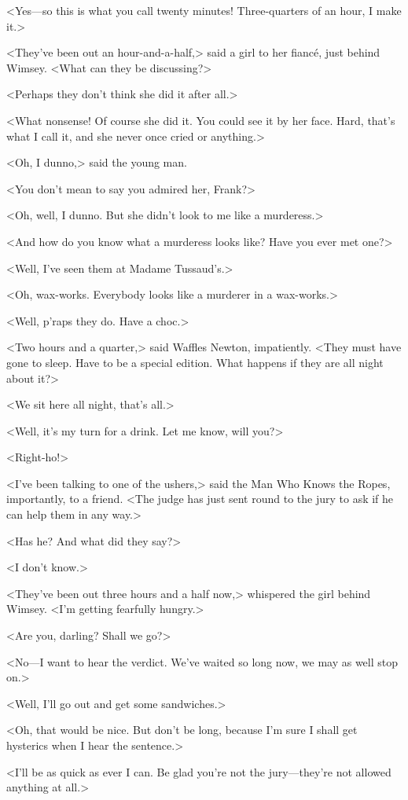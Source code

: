 <Yes—so this is what you call twenty minutes! Three-quarters of an hour, I make it.>

<They've been out an hour-and-a-half,> said a girl to her fiancé, just behind Wimsey. <What can they be discussing?>

<Perhaps they don't think she did it after all.>

<What nonsense! Of course she did it. You could see it by her face. Hard, that's what I call it, and she never once cried or anything.>

<Oh, I dunno,> said the young man.

<You don't mean to say you admired her, Frank?>

<Oh, well, I dunno. But she didn't look to me like a murderess.>

<And how do you know what a murderess looks like? Have you ever met one?>

<Well, I've seen them at Madame Tussaud's.>

<Oh, wax-works. Everybody looks like a murderer in a wax-works.>

<Well, p'raps they do. Have a choc.>

<Two hours and a quarter,> said Waffles Newton, impatiently. <They must have gone to sleep. Have to be a special edition. What happens if they are all night about it?>

<We sit here all night, that's all.>

<Well, it's my turn for a drink. Let me know, will you?>

<Right-ho!>

<I've been talking to one of the ushers,> said the Man Who Knows the Ropes, importantly, to a friend. <The judge has just sent round to the jury to ask if he can help them in any way.>

<Has he? And what did they say?>

<I don't know.>

<They've been out three hours and a half now,> whispered the girl behind Wimsey. <I'm getting fearfully hungry.>

<Are you, darling? Shall we go?>

<No—I want to hear the verdict. We've waited so long now, we may as well stop on.>

<Well, I'll go out and get some sandwiches.>

<Oh, that would be nice. But don't be long, because I'm sure I shall get hysterics when I hear the sentence.>

<I'll be as quick as ever I can. Be glad you're not the jury—they're not allowed anything at all.>

